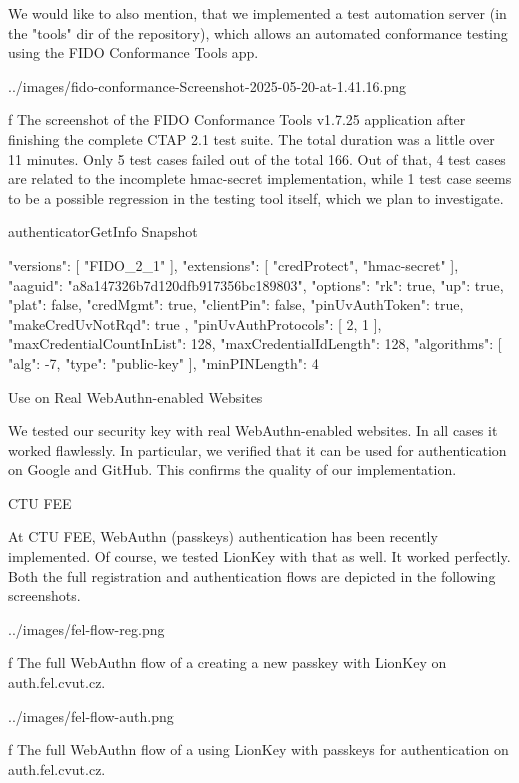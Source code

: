 We would like to also mention, that we implemented a test automation server (in the "tools" dir of the repository), which allows an automated conformance testing using the FIDO Conformance Tools app.

\midinsert
{}
\picw=144mm \cinspic ../images/fido-conformance-Screenshot-2025-05-20-at-1.41.16.png
\caption/f The screenshot of the FIDO Conformance Tools v1.7.25 application after finishing the complete CTAP 2.1 test suite. The total duration was a little over 11 minutes. Only 5 test cases failed out of the total 166. Out of that, 4 test cases are related to the incomplete hmac-secret implementation, while 1 test case seems to be a possible regression in the testing tool itself, which we plan to investigate.
\endinsert

\secc authenticatorGetInfo Snapshot

\begtt
{
	"versions": [
		"FIDO_2_1"
	],
	"extensions": [
		"credProtect",
		"hmac-secret"
	],
	"aaguid": "a8a147326b7d120dfb917356bc189803",
	"options": {
		"rk": true,
		"up": true,
		"plat": false,
		"credMgmt": true,
		"clientPin": false,
		"pinUvAuthToken": true,
		"makeCredUvNotRqd": true
	},
	"pinUvAuthProtocols": [
		2,
		1
	],
	"maxCredentialCountInList": 128,
	"maxCredentialIdLength": 128,
	"algorithms": [
		{
			"alg": -7,
			"type": "public-key"
		}
	],
	"minPINLength": 4
}
\endtt


\sec Use on Real WebAuthn-enabled Websites

We tested our security key with real WebAuthn-enabled websites. In all cases it worked flawlessly. In particular, we verified that it can be used for authentication on Google and GitHub. This confirms the quality of our implementation.

\secc CTU FEE

At CTU FEE, WebAuthn (passkeys) authentication has been recently implemented. Of course, we tested LionKey with that as well. It worked perfectly. Both the full registration and authentication flows are depicted in the following screenshots.

\midinsert
{}
\picw=144mm \cinspic ../images/fel-flow-reg.png
\caption/f The full WebAuthn flow of a creating a new passkey with LionKey on auth.fel.cvut.cz.
\endinsert


\midinsert
{}
\picw=144mm \cinspic ../images/fel-flow-auth.png
\caption/f The full WebAuthn flow of a using LionKey with passkeys for authentication on auth.fel.cvut.cz.
\endinsert
